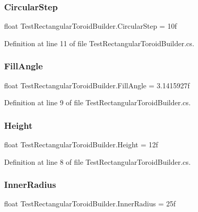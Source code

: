 \subsubsection{\texorpdfstring{CircularStep}{CircularStep}}
{\footnotesize\ttfamily float Test\+Rectangular\+Toroid\+Builder.\+Circular\+Step = 10f}



Definition at line 11 of file Test\+Rectangular\+Toroid\+Builder.\+cs.

\mbox{\label{class_test_rectangular_toroid_builder_aedbb430ff20f22deb1d437fbfaa9cc4c}} 
\subsubsection{\texorpdfstring{FillAngle}{FillAngle}}
{\footnotesize\ttfamily float Test\+Rectangular\+Toroid\+Builder.\+Fill\+Angle = 3.\+1415927f}



Definition at line 9 of file Test\+Rectangular\+Toroid\+Builder.\+cs.

\mbox{\label{class_test_rectangular_toroid_builder_a9b5d6407a6daaa6bd9ec91acaf146065}} 
\subsubsection{\texorpdfstring{Height}{Height}}
{\footnotesize\ttfamily float Test\+Rectangular\+Toroid\+Builder.\+Height = 12f}



Definition at line 8 of file Test\+Rectangular\+Toroid\+Builder.\+cs.

\mbox{\label{class_test_rectangular_toroid_builder_ad2d27a508825ab823e86a6ea3460a036}} 
\subsubsection{\texorpdfstring{InnerRadius}{InnerRadius}}
{\footnotesize\ttfamily float Test\+Rectangular\+Toroid\+Builder.\+Inner\+Radius = 25f}



